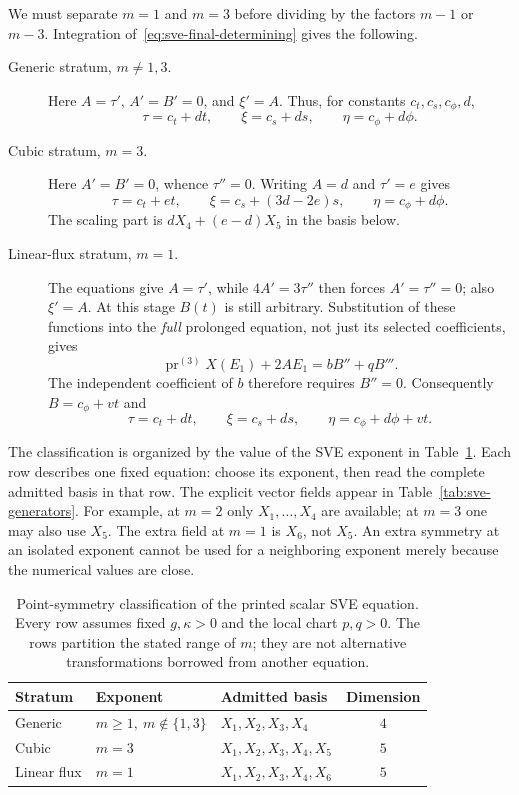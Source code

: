 \documentclass[11pt]{article}
\theoremstyle{definition}
\newcommand{\pr}{\operatorname{pr}}
\begin{document}
We must separate $m=1$ and $m=3$ before dividing by the factors $m-1$ or
$m-3$. Integration of~\eqref{eq:sve-final-determining} gives the following.
\begin{description}
\item[Generic stratum, $m\ne1,3$.]
Here $A=\tau'$, $A'=B'=0$, and $\xi'=A$. Thus, for constants
$c_t,c_s,c_\phi,d$,
\[
 \tau=c_t+dt,\qquad \xi=c_s+ds,\qquad \eta=c_\phi+d\phi.
\]
\item[Cubic stratum, $m=3$.]
Here $A'=B'=0$, whence $\tau''=0$. Writing $A=d$ and $\tau'=e$
gives
\[
 \tau=c_t+et,\qquad \xi=c_s+(3d-2e)s,\qquad \eta=c_\phi+d\phi.
\]
The scaling part is $dX_4+(e-d)X_5$ in the basis below.
\item[Linear-flux stratum, $m=1$.]
The equations give $A=\tau'$, while $4A'=3\tau''$ then forces
$A'=\tau''=0$; also $\xi'=A$. At this stage $B(t)$ is still arbitrary.
Substitution of these functions into the \emph{full} prolonged equation,
not just its selected coefficients, gives
\[
 \pr^{(3)}X(E_1)+2A E_1=bB''+qB'''.
\]
The independent coefficient of $b$ therefore requires $B''=0$.
Consequently $B=c_\phi+vt$ and
\[
 \tau=c_t+dt,\qquad \xi=c_s+ds,\qquad
 \eta=c_\phi+d\phi+vt.
\]
\end{description}

The classification is organized by the value of the SVE exponent in
Table~\ref{tab:sve-classification}. Each row describes one fixed equation:
choose its exponent, then read the complete admitted basis in that row.
The explicit vector fields appear in Table~\ref{tab:sve-generators}.
For example, at $m=2$ only $X_1,\ldots,X_4$ are available; at $m=3$
one may also use $X_5$. The extra field at $m=1$ is $X_6$, not $X_5$.
An extra symmetry at an isolated exponent cannot be used for a neighboring
exponent merely because the numerical values are close.

\begin{table}[htbp]
\centering\small
\begin{tabularx}{\linewidth}{@{}llXc@{}}
\toprule
Stratum & Exponent & Admitted basis & Dimension\\
\midrule
Generic & $m\geq1,\ m\notin\{1,3\}$ & $X_1,X_2,X_3,X_4$ & $4$\\
Cubic & $m=3$ & $X_1,X_2,X_3,X_4,X_5$ & $5$\\
Linear flux & $m=1$ & $X_1,X_2,X_3,X_4,X_6$ & $5$\\
\bottomrule
\end{tabularx}
\caption{Point-symmetry classification of the printed scalar SVE equation.
Every row assumes fixed $g,\kappa>0$ and the local chart $p,q>0$.
The rows partition the stated range of $m$; they are not alternative
transformations borrowed from another equation.}
\label{tab:sve-classification}
\end{table}
\end{document}
